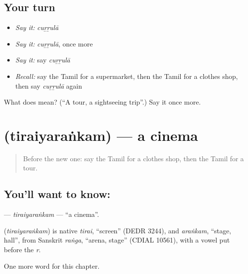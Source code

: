 \subsection*{Your turn}
\begin{itemize}
\raggedright
  \item \emph{Say it:} \emph{cuṟṟulā}
  \item \emph{Say it:} \emph{cuṟṟulā}, once more
  \item \emph{Say it:} say \emph{cuṟṟulā}
  \item \emph{Recall:} say the Tamil for a supermarket, then the Tamil for a clothes shop, then say \emph{cuṟṟulā} again
\end{itemize}

\begin{tcolorbox}[breakable,colback=teal!4,colframe=teal!35!black,title={Before you move on}]
What does  mean? (\textquotedblleft{}A tour, a sightseeing trip\textquotedblright{}.) Say it once more.
\end{tcolorbox}
\section[\texorpdfstring{\ta{திரையரங்கம்} (tiraiyaraṅkam)}{திரையரங்கம் (tiraiyaraṅkam)}]{ (tiraiyaraṅkam) — a cinema}

\label{lesson:TA-C205-tiraiyarankam}



\begin{quote}
Before the new one: say the Tamil for a clothes shop, then the Tamil for a tour.
\end{quote}

\subsection*{You'll want to know: }
\textbf{} — \emph{tiraiyaraṅkam} — \textquotedblleft{}a cinema\textquotedblright{}.

\begin{cousinweb}
\textbf{} (\emph{tiraiyaraṅkam}) is native \emph{tirai}, \textquotedblleft{}screen\textquotedblright{} (DEDR 3244), and \emph{araṅkam}, \textquotedblleft{}stage, hall\textquotedblright{}, from Sanskrit \emph{raṅga}, \textquotedblleft{}arena, stage\textquotedblright{} (CDIAL 10561), with a vowel put before the \emph{r}.
\end{cousinweb}

\begin{grammarlens}[title={What you've built}]
One more word for this chapter.
\end{grammarlens}

